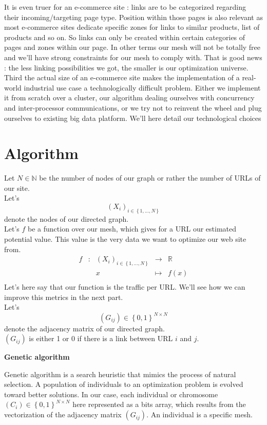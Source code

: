 \documentclass{iSWAGArticle}
\begin{document}
It is even truer for an e-commerce site : links are to be categorized regarding their incoming/targeting page type. Position within those pages
is also relevant as most e-commerce sites dedicate specific zones for links to similar products, list of products and so on.
So links can only be created within certain categories of pages and zones within our page. In other terms our mesh will not be totally free and 
we'll have strong constraints for our mesh to comply with. That is good news : the less linking possibilities we got, the smaller is our optimization universe.
\\
\indent
Third the actual size of an e-commerce site makes the implementation of a real-world industrial use case a technologically difficult problem.
Either we implement it from scratch over a cluster, our algorithm dealing ourselves with concurrency and inter-processor communications,
or we try not to reinvent the wheel and plug ourselves to existing big data platform. We'll here detail our technological choices
\section{Algorithm}
Let $N \in \mathbb{N}$ be the number of nodes of our graph or rather the number of URLs of our site.
 \\\newline
Let's $$\left(X_i\right)_{i \in \left\{1,...,N\right\}}$$ denote the nodes of our directed graph.
 \\\newline
Let's $f$ be a function over our mesh, which gives for a URL our estimated potential value. This value is the
very data we want to optimize our web site from.
\begin{equation}
\begin{array}{ccccc}
f & : & \left(X_i\right)_{i \in \left\{1,...,N\right\}} & \to & \mathbb{R} \\
 & & x & \mapsto & f(x) \\
\end{array}
\end{equation}
Let's here say that our function is the traffic per URL. We'll see how we can improve this metrics in the next part.
 \\\newline
Let's $$\left(G_{ij}\right)  \in \left\{0,1\right\}^{N\times N}$$ denote the adjacency matrix of our directed graph.
 \\\newline
$\left(G_{ij}\right)$ is either 1 or 0 if there is a link between URL $i$ and $j$.
\begin{center}
\textbf{\large Genetic algorithm}
\end{center}
Genetic algorithm is a search heuristic that mimics the process of natural selection. 
A population of individuals to an optimization problem is evolved toward better solutions. 
In our case, each individual or chromosome $\left(C_{i}\right)  \in \left\{0,1\right\}^{N\times N}$ here represented as a bits array, which results from the vectorization of
the adjacency matrix $\left(G_{ij}\right)$. An individual is a specific mesh. 
\end{document}
